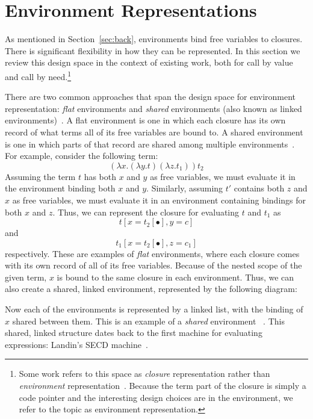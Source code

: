 \section{Environment Representations} \label{sec:env}

As mentioned in Section~\ref{sec:back}, environments bind free variables to
closures. There is significant flexibility in how they can be represented. In
this section we review this design space in the context of existing work, both
for call by value and call by need.\footnote{Some work refers to this
space as \emph{closure} representation rather than \emph{environment}
representation~\cite{shao1994space,appel1988optimizing}.  Because the term
part of the closure is simply a code pointer and the
interesting design choices are in the environment, we refer to
the topic as environment representation.}

There are two common approaches that span the design space for environment
representation: \emph{flat} environments and \emph{shared} environments (also
known as linked environments)~\cite{appel1988optimizing,shao1994space}. A flat
environment is one in which each closure has its own record of what terms all of
its free variables are bound to. A shared environment is one in which parts of
that record are shared among multiple
environments~\cite{appel1988optimizing,shao1994space}. For example, consider the
following term: $$(\lambda x.(\lambda y.t) (\lambda z.t_1)) t_2$$ Assuming the
term $t$ has both $x$ and $y$ as free
variables, we must evaluate it in the environment binding both $x$ and $y$.
Similarly, assuming $t'$ contains both $z$ and $x$ as free variables, we must
evaluate it in an environment containing bindings for both $x$ and $z$. Thus, we
can represent the closure for evaluating $t$ and $t_1$  as $$t[x=t_2[\bullet],
y=c]$$ and $$t_1[x=t_2[\bullet], z=c_1]$$ respectively.  These are examples of
\emph{flat} environments, where each closure comes with its own record of all of
its free variables. Because of the nested scope of the given term, $x$ is bound
to the same closure in each environment.  Thus, we can also create a shared,
linked environment, represented by the following diagram:

\begin{center}
\end{center}
Now each of the environments is represented by a linked list, with the binding
of $x$ shared between them. This is an example of a \emph{shared} environment
~\cite{appel1988optimizing}. This shared, linked structure dates back to the 
first machine for evaluating expressions: Landin's SECD
machine~\cite{landin1964mechanical}.

